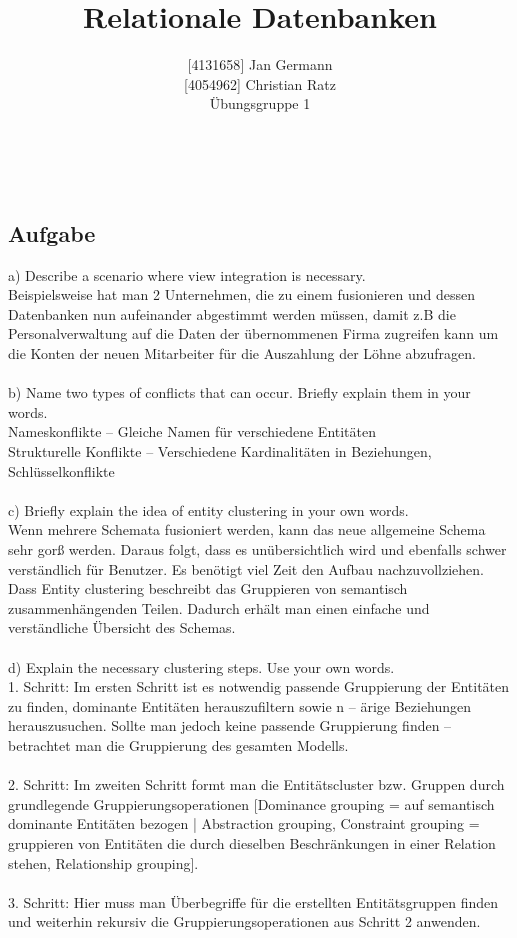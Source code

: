 \documentclass[11pt,a4paper,DIV=9]{scrartcl}
\author{{[}4131658{]} Jan Germann \\{[}4054962{]} Christian Ratz\\Übungsgruppe 1}
\title{Relationale Datenbanken}
\newcounter{temp}
\newcommand{\aufgabe}[1]{
  \setcounter{temp}{\value{subsection}}
  \setcounter{subsection}{#1}
  \addtocounter{subsection}{-1}
  \subsection{Aufgabe}
  \setcounter{subsection}{\value{temp}}
}
\renewcommand{\author}[1]{\renewcommand{\author}{#1}}
\renewcommand{\title}[1]{\renewcommand{\title}{#1}}
\newcommand{\makehomeworktitle}{
  \begin{minipage}[t]{6.5cm}
    \sf{\author}
  \end{minipage}
  \begin{minipage}[t]{6.5cm}
    \begin{flushright}
      \sf{\title\\\today}
    \end{flushright}
  \end{minipage}
  \\[0.2cm]
  \begin{center}
    \sf{
      \color{blue}{
        \LARGE{Aufgabenblatt \blattnr}
      }
    }
  \end{center}
  \vspace{0.1cm}
}
\begin{document}
\makehomeworktitle

\aufgabe{1}
a)  Describe a scenario where view integration is necessary. \\
Beispielsweise hat man 2 Unternehmen, die zu einem fusionieren und dessen Datenbanken nun aufeinander abgestimmt werden m\"ussen, damit z.B die Personalverwaltung auf die Daten der \"ubernommenen Firma zugreifen kann um die Konten der neuen Mitarbeiter f\"ur die Auszahlung der L\"ohne abzufragen. \\\\
b)  Name two types of conflicts that can occur. Briefly explain them in your words. \\
Nameskonflikte -- Gleiche Namen f\"ur verschiedene Entit\"aten \\
Strukturelle Konflikte -- Verschiedene Kardinalit\"aten in Beziehungen, Schl\"usselkonflikte \\\\
c)  Briefly explain the idea of entity clustering in your own words. \\
Wenn mehrere Schemata fusioniert werden, kann das neue allgemeine Schema sehr gor{\ss} werden. Daraus folgt, dass es un\"ubersichtlich wird und ebenfalls schwer verst\"andlich f\"ur Benutzer. Es ben\"otigt viel Zeit den Aufbau nachzuvollziehen. Dass Entity clustering beschreibt das Gruppieren von semantisch zusammenh\"angenden Teilen. Dadurch erh\"alt man einen einfache und verst\"andliche \"Ubersicht des Schemas. \\\\
d)  Explain the necessary clustering steps. Use your own words. \\
1. Schritt: Im ersten Schritt ist es notwendig passende Gruppierung der Entit\"aten zu finden, dominante Entit\"aten herauszufiltern sowie n -- \"arige Beziehungen herauszusuchen. Sollte man jedoch keine passende Gruppierung finden -- betrachtet man die Gruppierung des gesamten Modells. \\\\
2. Schritt: Im zweiten Schritt formt man die Entit\"atscluster bzw. Gruppen durch grundlegende Gruppierungsoperationen [Dominance grouping = auf semantisch dominante Entit\"aten bezogen | Abstraction grouping, Constraint grouping = gruppieren von Entit\"aten die durch dieselben Beschr\"ankungen in einer Relation stehen, Relationship grouping]. \\\\
3. Schritt: Hier muss man \"Uberbegriffe f\"ur die erstellten Entit\"atsgruppen finden und weiterhin rekursiv die Gruppierungsoperationen aus Schritt 2 anwenden. \\\\
\end{document}
